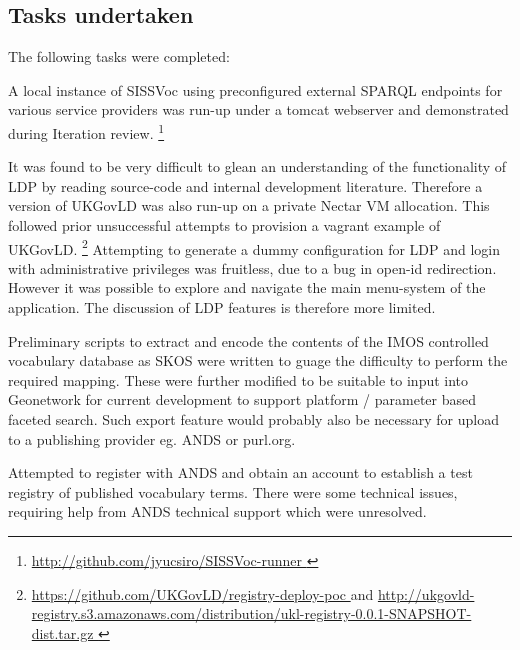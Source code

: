 \documentclass[10pt,a4paper]{article}
\begin{document}
\begin{flushleft}
\clearpage



\section{
  Tasks undertaken
}

%  
  The following tasks were completed:  

    \item[] A local instance of SISSVoc using preconfigured external SPARQL
  endpoints for various service providers was run-up under a tomcat webserver and
  demonstrated during Iteration review.  \footnote{ \url {
  http://github.com/jyucsiro/SISSVoc-runner }  } 

    \item[] It was found to be very difficult to glean an understanding of the
  functionality of LDP by reading source-code and internal development
  literature. Therefore a version of UKGovLD was also run-up on a private Nectar
  VM allocation. This followed prior unsuccessful attempts to provision a vagrant
  example of UKGovLD.  \footnote{ \url {
  https://github.com/UKGovLD/registry-deploy-poc } and \url {
  http://ukgovld-registry.s3.amazonaws.com/distribution/ukl-registry-0.0.1-SNAPSHOT-dist.tar.gz
  } }
    Attempting to generate a dummy configuration for LDP and login with
  administrative privileges was fruitless, due to a bug in open-id redirection.
  However it was possible to explore and navigate the main menu-system of the
  application.
    The discussion of LDP features is therefore more limited.

    \item[] Preliminary scripts to extract and encode the contents of the IMOS
  controlled vocabulary database as SKOS were written to guage the difficulty to
  perform the required mapping. These were further modified to be suitable to
  input into Geonetwork for current development to support platform / parameter
  based faceted search. Such export feature would probably also be necessary for
  upload to a publishing provider eg. ANDS or purl.org. 

    \item[] Attempted to register with ANDS and obtain an account to establish a
  test registry of published vocabulary terms. There were some technical issues,
  requiring help from ANDS technical support which were unresolved.
      

\end{flushleft}
\end{document}
